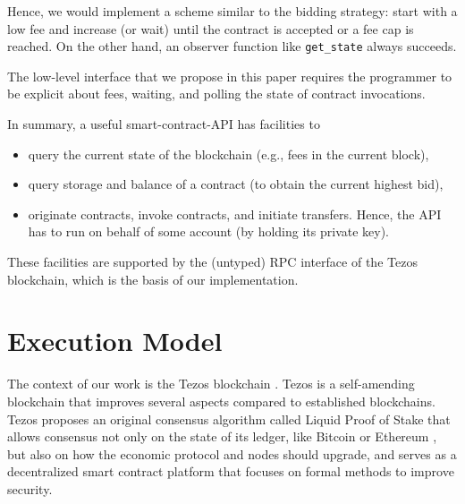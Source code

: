 \documentclass[runningheads]{llncs}
\begin{document}
Hence, we would implement a scheme similar to
the bidding strategy: start with a low fee and increase (or wait) until the
contract is accepted or a fee cap is reached. On the other hand, an
observer function like \lstinline/get_state/ always succeeds.

The low-level interface that we propose in this paper requires the
programmer to be explicit about fees, waiting, and polling the state
of contract invocations. 

In summary, a useful smart-contract-API  has facilities to
\begin{itemize}
\item query the current state of the blockchain (e.g., fees in the
  current block),
\item query storage and balance of a contract (to obtain
  the current highest bid),
\item originate contracts, invoke contracts, and initiate
  transfers. Hence, the API has to run on
  behalf of some account (by holding its private key).
\end{itemize}
These facilities are supported by the (untyped) RPC interface of the Tezos
blockchain, which is the basis of our implementation. 

\section{Execution Model}
\label{sec:execution-model}
The context of our work is the Tezos blockchain \cite{tezos-whitepaper,tezos-intropaper}. Tezos is a self-amending blockchain that improves several aspects compared to established blockchains. Tezos proposes an original consensus algorithm called Liquid Proof of Stake that allows consensus not only on the state of its ledger, like Bitcoin \cite{bitcoin-whitepaper} or Ethereum \cite{eth-whitepaper}, but also on how the economic protocol and nodes should upgrade, and serves as a decentralized smart contract platform that focuses on formal methods to improve security. 
\end{document}

